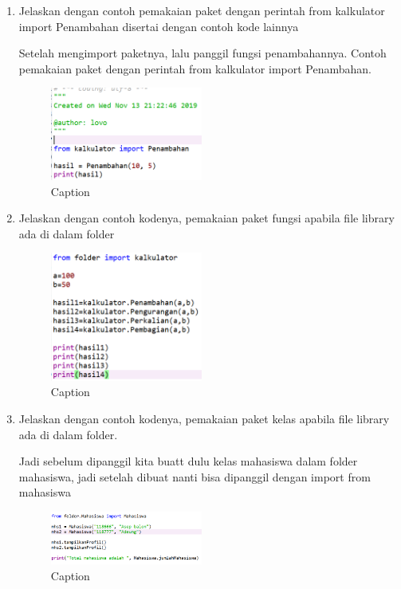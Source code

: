 \begin{enumerate}
    \item Jelaskan dengan contoh pemakaian paket dengan perintah from kalkulator import Penambahan disertai dengan contoh kode lainnya
    \par Setelah mengimport paketnya, lalu panggil fungsi penambahannya. Contoh pemakaian paket dengan perintah from kalkulator import Penambahan.
    \begin{figure} [htbp!]
            \centering
            \includegraphics[width=5cm]{figures/import.PNG}
            \caption{Caption}
            \label{import}
        \end{figure}
        
     \item Jelaskan  dengan  contoh  kodenya,  pemakaian  paket  fungsi  apabila  file  library ada di dalam folder 
     \begin{figure} [htbp!]
            \centering
            \includegraphics[width=5cm]{figures/import1.PNG}
            \caption{Caption}
            \label{import}
        \end{figure}
        
     \item Jelaskan dengan contoh kodenya, pemakaian paket kelas apabila file library ada di dalam folder.
     \par Jadi sebelum dipanggil kita buatt dulu kelas mahasiswa dalam folder mahasiswa, jadi setelah dibuat nanti bisa dipanggil dengan import from mahasiswa
      \begin{figure} [htbp!]
            \centering
            \includegraphics[width=5cm]{figures/importkelas.PNG}
            \caption{Caption}
            \label{import}
        \end{figure}
\end{enumerate}

